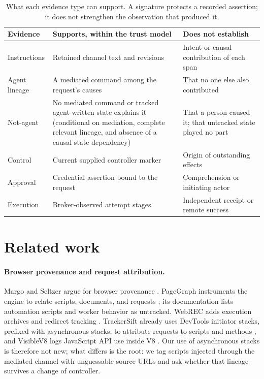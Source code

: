 \documentclass[11pt]{article}
\theoremstyle{definition}
\begin{document}
\begin{table}[tb]
\centering\small
\begin{tabularx}{\linewidth}{@{}lYY@{}}
\toprule
Evidence & Supports, within the trust model & Does not establish \\
\midrule
Instructions & Retained channel text and revisions & Intent or causal contribution of each span \\
Agent lineage & A mediated command among the request's causes & That no one else also contributed \\
Not-agent & No mediated command or tracked agent-written state explains it (conditional on mediation, complete relevant lineage, and absence of a causal state dependency) & That a person caused it; that untracked state played no part \\
Control & Current supplied controller marker & Origin of outstanding effects \\
Approval & Credential assertion bound to the request & Comprehension or initiating actor \\
Execution & Broker-observed attempt stages & Independent receipt or remote success \\
\bottomrule
\end{tabularx}
\caption{What each evidence type can support. A signature protects a recorded
assertion; it does not strengthen the observation that produced it.}
\label{tab:evidence}
\end{table}

\section{Related work}\label{sec:related}
\paragraph{Browser provenance and request attribution.} Margo and Seltzer argue for
browser provenance \cite{margo2009}. PageGraph instruments the engine to relate
scripts, documents, and requests \cite{pagegraph}; its documentation lists
automation scripts and worker behavior as untracked. WebREC adds execution
archives and redirect tracking \cite{hantke2025}. TrackerSift already uses
DevTools initiator stacks, prefixed with asynchronous stacks, to attribute
requests to scripts and methods \cite{amjad2021trackersift}, and VisibleV8 logs
JavaScript API use inside V8 \cite{visiblev8}. Our use of asynchronous stacks is
therefore not new; what differs is the root: we tag scripts injected through the
mediated channel with unguessable source URLs and ask whether that lineage
survives a change of controller.
\end{document}
